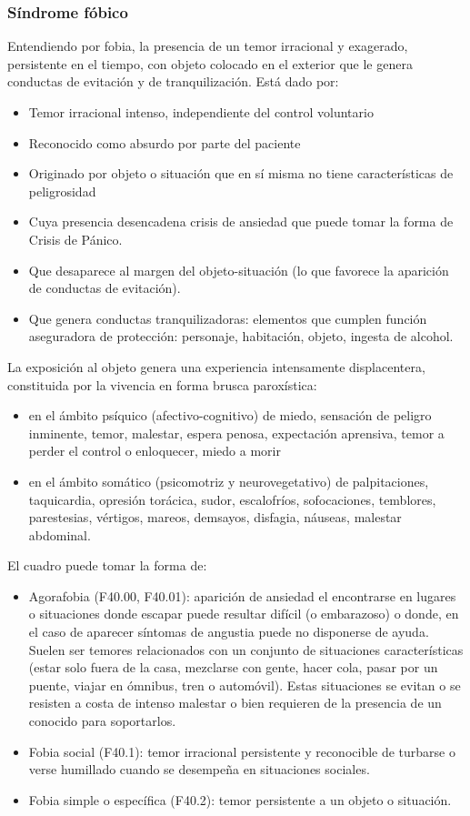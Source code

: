 \subsubsection*{Síndrome fóbico}
Entendiendo por fobia, la presencia de un temor irracional y exagerado, persistente en el tiempo, con objeto colocado en el exterior que le genera conductas de evitación y de tranquilización. Está dado por:
\begin{itemize}
	\item Temor irracional intenso, independiente del control voluntario
	\item Reconocido como absurdo por parte del paciente
	\item Originado por objeto o situación que en sí misma no tiene características de peligrosidad
	\item Cuya presencia desencadena crisis de ansiedad que puede tomar la forma de Crisis de Pánico.
	\item Que desaparece al margen del objeto-situación (lo que favorece la aparición de conductas de evitación).
	\item Que genera conductas tranquilizadoras: elementos que cumplen función aseguradora de protección: personaje, habitación, objeto, ingesta de alcohol.
\end{itemize}
La exposición al objeto genera una experiencia intensamente displacentera, constituida por la vivencia en forma brusca paroxística:
\begin{itemize}
	\item en el ámbito psíquico (afectivo-cognitivo) de miedo, sensación de peligro inminente, temor, malestar, espera penosa, expectación aprensiva, temor a perder el control o enloquecer, miedo a morir
	\item en el ámbito somático (psicomotriz y neurovegetativo) de palpitaciones, taquicardia, opresión torácica, sudor, escalofríos, sofocaciones, temblores, parestesias, vértigos, mareos, demsayos, disfagia, náuseas, malestar abdominal.
\end{itemize}
El cuadro puede tomar la forma de:
\begin{itemize}
	\item Agorafobia (F40.00, F40.01): aparición de ansiedad el encontrarse en lugares o situaciones donde escapar puede resultar difícil (o embarazoso) o donde, en el caso de aparecer síntomas de angustia puede no disponerse de ayuda. Suelen ser temores relacionados con un conjunto de situaciones características (estar solo fuera de la casa, mezclarse con gente, hacer cola, pasar por un puente, viajar en ómnibus, tren o automóvil). Estas situaciones se evitan o se resisten a costa de intenso malestar o bien requieren de la presencia de un conocido para soportarlos.
	\item Fobia social (F40.1): temor irracional persistente y reconocible de turbarse o verse humillado cuando se desempeña en situaciones sociales.
	\item Fobia simple o específica (F40.2): temor persistente a un objeto o situación.
\end{itemize}
